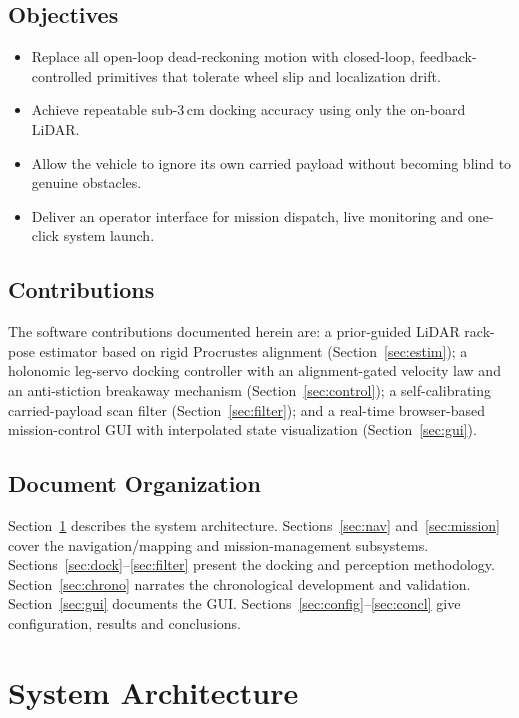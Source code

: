 \documentclass[11pt,a4paper]{article}
\begin{document}
\subsection{Objectives}
\begin{itemize}[leftmargin=1.4em,itemsep=1pt]
  \item Replace all open-loop dead-reckoning motion with closed-loop,
        feedback-controlled primitives that tolerate wheel slip and
        localization drift.
  \item Achieve repeatable sub-3\,cm docking accuracy using only the
        on-board LiDAR.
  \item Allow the vehicle to ignore its own carried payload without becoming
        blind to genuine obstacles.
  \item Deliver an operator interface for mission dispatch, live monitoring
        and one-click system launch.
\end{itemize}

\subsection{Contributions}
The software contributions documented herein are: a prior-guided LiDAR
rack-pose estimator based on rigid Procrustes alignment
(Section~\ref{sec:estim}); a holonomic leg-servo docking controller with an
alignment-gated velocity law and an anti-stiction breakaway mechanism
(Section~\ref{sec:control}); a self-calibrating carried-payload scan filter
(Section~\ref{sec:filter}); and a real-time browser-based mission-control GUI
with interpolated state visualization (Section~\ref{sec:gui}).

\subsection{Document Organization}
Section~\ref{sec:arch} describes the system architecture. Sections~\ref{sec:nav}
and~\ref{sec:mission} cover the navigation/mapping and mission-management
subsystems. Sections~\ref{sec:dock}--\ref{sec:filter} present the docking and
perception methodology. Section~\ref{sec:chrono} narrates the chronological
development and validation. Section~\ref{sec:gui} documents the GUI.
Sections~\ref{sec:config}--\ref{sec:concl} give configuration, results and
conclusions.

\section{System Architecture}\label{sec:arch}
\end{document}
